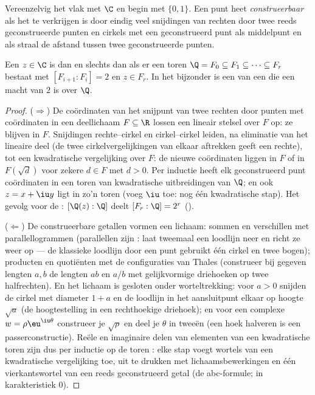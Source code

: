 \begin{definition}\label{def:b3:galois:constructible}
Vereenzelvig het vlak met $\C$ en begin met $\{0, 1\}$. Een punt
heet \emph{construeerbaar} als het te
verkrijgen is door eindig veel snijdingen van rechten door twee
reeds geconstrueerde punten en cirkels met een geconstrueerd punt
als middelpunt en als straal de afstand tussen twee
geconstrueerde punten.
\end{definition}

\begin{theorem}[Wantzel]\label{thm:b3:galois:wantzel}
Een $z \in \C$ is  dan en slechts dan als er een
toren $\Q = F_0 \subseteq F_1 \subseteq \dots \subseteq F_r$
bestaat met $[F_{i+1} : F_i] = 2$ en $z \in F_r$. In het bijzonder
is een   van een  die een
macht van $2$ is over $\Q$.
\end{theorem}

\begin{proof}
($\Rightarrow$) De coördinaten van het snijpunt van twee rechten
door punten met coördinaten in een deellichaam $F \subseteq \R$
lossen een lineair stelsel over $F$ op: ze blijven in $F$.
Snijdingen rechte--cirkel en cirkel--cirkel leiden, na eliminatie
van het lineaire deel (de twee cirkelvergelijkingen van elkaar
aftrekken geeft een rechte), tot een kwadratische vergelijking
over $F$: de nieuwe coördinaten liggen in $F$ of in $F(\sqrt d)$
voor zekere $d \in F$ met $d > 0$. Per inductie heeft elk
geconstrueerd punt coördinaten in een toren van kwadratische
uitbreidingen van $\Q$; en ook $z = x + \iu y$ ligt in zo'n toren
(voeg $\iu$ toe: nog één kwadratische stap). Het gevolg voor de
: $[\Q(z):\Q]$ deelt $[F_r : \Q] = 2^r$ ().

($\Leftarrow$) De construeerbare getallen vormen een lichaam:
sommen en verschillen met parallellogrammen (parallellen zijn
: laat tweemaal een loodlijn neer en richt ze weer
op --- de klassieke loodlijn door een punt gebruikt één cirkel en
twee bogen); producten en quotiënten met de configuraties van
Thales (construeer bij gegeven lengten $a, b$ de lengten $ab$ en
$a/b$ met gelijkvormige driehoeken op twee halfrechten). En het
lichaam is gesloten onder worteltrekking: voor $a > 0$ snijden de
cirkel met diameter $1 + a$ en de loodlijn in het aansluitpunt
elkaar op hoogte $\sqrt a$ (de hoogtestelling in een rechthoekige
driehoek); en voor een complexe $w = \rho\eu^{\iu\theta}$
construeer je $\sqrt\rho$ en deel je $\theta$ in tweeën (een hoek
halveren is een passerconstructie). Reële en imaginaire delen van
elementen van een kwadratische toren zijn dus per inductie op de
toren : elke stap voegt wortels van een kwadratische
vergelijking toe, uit te drukken met lichaamsbewerkingen en één
vierkantswortel van een reeds geconstrueerd getal (de abc-formule;
in karakteristiek $0$).
\end{proof}

